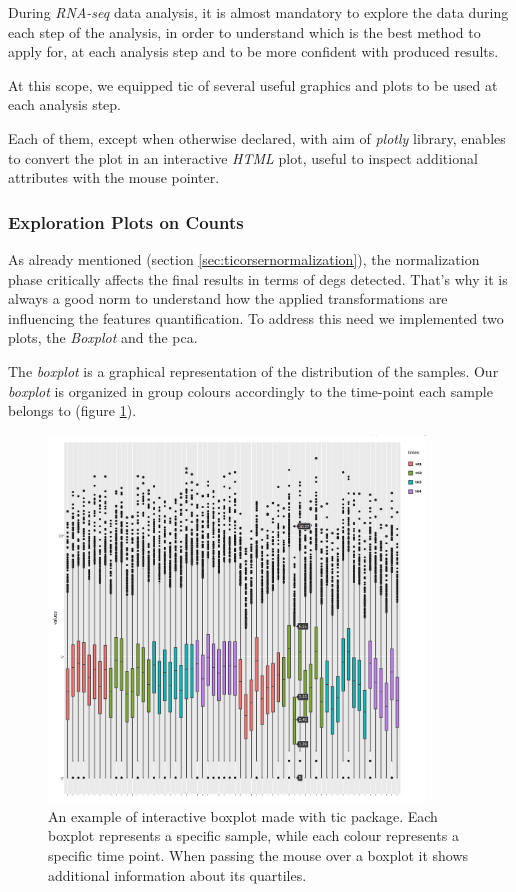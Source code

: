 During \textit{RNA-seq} data analysis, it is almost mandatory to explore the data during each step of the analysis, in order to understand which is the best method to apply for, at each analysis step and to be more confident with produced results. 

At this scope, we equipped \gls{tic} of several useful graphics and plots to be used at each analysis step.

Each of them, except when otherwise declared, with aim of \textit{plotly} library, enables to convert the plot in an interactive \textit{HTML} plot, useful to inspect additional attributes with the mouse pointer.

\subsubsection{Exploration Plots on Counts}
As already mentioned (section \ref{sec:ticorsernormalization}), the normalization phase critically affects the final results in terms of \glspl{deg} detected.
That's why it is always a good norm to understand how the applied transformations are influencing the features quantification. 
To address this need we implemented two plots, the \textit{Boxplot} and the \gls{pca}.

The \textit{boxplot} is a graphical representation of the distribution of the samples. 
Our \textit{boxplot} is organized in group colours accordingly to the time-point each sample belongs to (figure \ref{fig:ticorserboxplot}).

\begin{figure}[H]
\centering
\includegraphics[width=10cm, keepaspectratio]{img/ticorser/boxplot_example.png}
\caption[ticorser boxplot]{An example of interactive boxplot made with \gls{tic} package. Each boxplot represents a specific sample, while each colour represents a specific time point. When passing the mouse over a boxplot it shows additional information about its quartiles.}
\label{fig:ticorserboxplot}
\end{figure}

